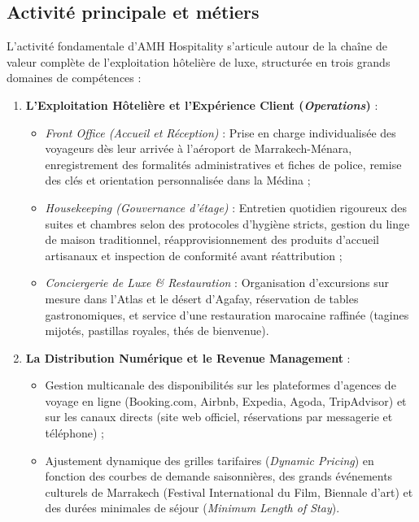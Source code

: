 \documentclass[12pt,a4paper,oneside]{report}
\begin{document}
\subsection{Activité principale et métiers}

L'activité fondamentale d'AMH Hospitality s'articule autour de la chaîne de valeur complète de l'exploitation hôtelière de luxe, structurée en trois grands domaines de compétences :

\begin{enumerate}
    \item \textbf{L'Exploitation Hôtelière et l'Expérience Client (\textit{Operations})} :
    \begin{itemize}
        \item \textit{Front Office (Accueil et Réception)} : Prise en charge individualisée des voyageurs dès leur arrivée à l'aéroport de Marrakech-Ménara, enregistrement des formalités administratives et fiches de police, remise des clés et orientation personnalisée dans la Médina ;
        \item \textit{Housekeeping (Gouvernance d'étage)} : Entretien quotidien rigoureux des suites et chambres selon des protocoles d'hygiène stricts, gestion du linge de maison traditionnel, réapprovisionnement des produits d'accueil artisanaux et inspection de conformité avant réattribution ;
        \item \textit{Conciergerie de Luxe \& Restauration} : Organisation d'excursions sur mesure dans l'Atlas et le désert d'Agafay, réservation de tables gastronomiques, et service d'une restauration marocaine raffinée (tagines mijotés, pastillas royales, thés de bienvenue).
    \end{itemize}
    \item \textbf{La Distribution Numérique et le Revenue Management} :
    \begin{itemize}
        \item Gestion multicanale des disponibilités sur les plateformes d'agences de voyage en ligne (Booking.com, Airbnb, Expedia, Agoda, TripAdvisor) et sur les canaux directs (site web officiel, réservations par messagerie et téléphone) ;
        \item Ajustement dynamique des grilles tarifaires (\textit{Dynamic Pricing}) en fonction des courbes de demande saisonnières, des grands événements culturels de Marrakech (Festival International du Film, Biennale d'art) et des durées minimales de séjour (\textit{Minimum Length of Stay}).
    \end{itemize}

\end{enumerate}
\end{document}
